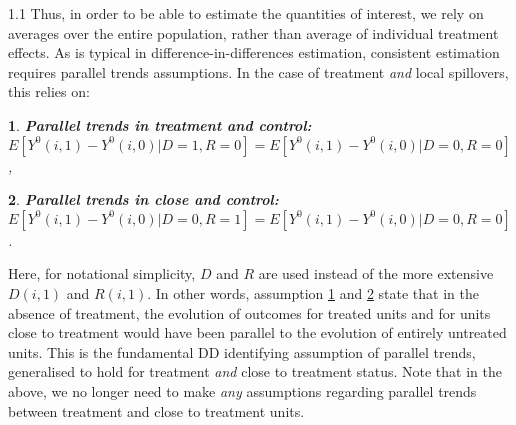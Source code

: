 \documentclass{article}
\makeatletter
\newtheorem*{assumption*}{\assumptionnumber}
\providecommand{\assumptionnumber}{}
\newenvironment{assumption}[2]
 {%
  \renewcommand{\assumptionnumber}{Assumption #1{#2}}%
  \begin{assumption*}%
  \protected@edef\@currentlabel{#1}%
 }
 {%
  \end{assumption*}
 }
\makeatother
\begin{document}
\begin{spacing}{1.1}
Thus, in order to be able to estimate the quantities of interest, we rely on
averages over the entire population, rather than average of individual 
treatment effects.  As is typical in difference-in-differences estimation,
consistent estimation requires parallel trends assumptions.  In the case of
treatment \emph{and} local spillovers, this relies on:

\begin{assumption}{1}{}
\label{Sass:PT}
\textbf{Parallel trends in treatment and control:} \\
$E[Y^0(i,1)-Y^0(i,0)|D=1,R=0]=E[Y^0(i,1)-Y^0(i,0)|D=0,R=0]$,
\end{assumption}
\begin{assumption}{2}{}
\label{Sass:PTC}
\textbf{Parallel trends in close and control:} \\
$E[Y^0(i,1)-Y^0(i,0)|D=0,R=1]=E[Y^0(i,1)-Y^0(i,0)|D=0,R=0]$.
\end{assumption}

Here, for notational simplicity, $D$ and $R$ are used instead of the more 
extensive $D(i,1)$ and $R(i,1)$.  In other words, assumption \ref{Sass:PT}
and \ref{Sass:PTC} state that in the absence of treatment, the evolution
of outcomes for treated units and for units close to treatment would have
been parallel to the evolution of entirely untreated units.  This is the
fundamental DD identifying assumption of parallel trends, generalised to
hold for treatment \emph{and} close to treatment status.  Note that in
the above, we no longer need to make \emph{any} assumptions regarding
parallel trends between treatment and close to treatment units.


\end{spacing}
\end{document}
